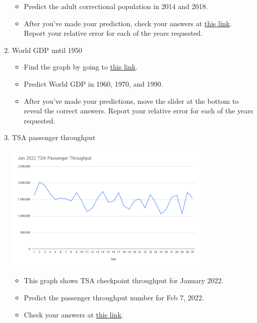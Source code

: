 \documentclass[11pt]{article}
\begin{document}
\begin{enumerate}
	\begin{itemize}
		\item Predict the adult correctional population in 2014 and 2018.
            \item After you've made your prediction, check your answers at \href{https://bjs.ojp.gov/data/key-statistics#total-correction-population}{this link}. Report your relative error for each of the years requested.
	\end{itemize}
	
	\item World GDP until 1950
	\begin{itemize}
		\item Find the graph by going to \href{https://ourworldindata.org/grapher/world-gdp-over-the-last-two-millennia?time=1..1950}{this link}.
		\item Predict World GDP in 1960, 1970, and 1990.
            \item After you've made your predictions, move the slider at the bottom to reveal the correct answers. Report your relative error for each of the years requested.
	\end{itemize}
	
	\item TSA passenger throughput

	\begin{center}	
		\includegraphics[width = 375px]{tsa_checkpoint2.png}
	\end{center}

	\begin{itemize}
		\item This graph shows TSA checkpoint throughput for January 2022.
		\item Predict the passenger throughput number for Feb 7, 2022.
            \item Check your answers at \href{https://www.tsa.gov/travel/passenger-volumes/2022}{this link}.
	\end{itemize}
	

\end{enumerate}
\end{document}
